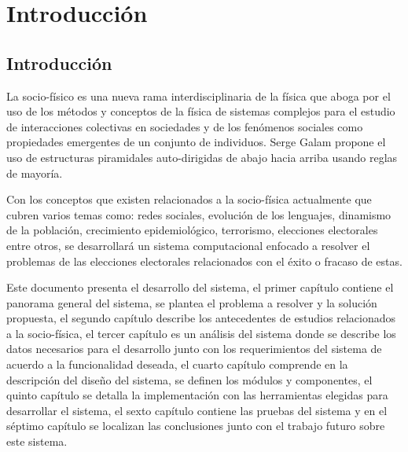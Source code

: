 \newpage 
\chapter*{Introducción}

\vspace*{2cm}

\section*{Introducción}
La socio-físico es una nueva rama interdisciplinaria de la física que aboga por el uso de los métodos y conceptos de la física de sistemas complejos para el estudio de interacciones colectivas en sociedades y de los fenómenos sociales como propiedades emergentes de un conjunto de individuos. Serge Galam propone el uso de estructuras piramidales auto-dirigidas de abajo hacia arriba usando reglas de mayoría. \cite{MarioH.RamirezDiaz2014, Galam.1986, Galam1990, Galam1991, Galam2000}

Con los conceptos que existen relacionados a la socio-física actualmente que cubren varios temas como: redes sociales, evolución de los lenguajes, dinamismo de la población, crecimiento epidemiológico, terrorismo, elecciones electorales entre otros, se desarrollará un sistema computacional enfocado a resolver el problemas de las elecciones electorales relacionados con el éxito o fracaso de estas.

Este documento presenta el desarrollo del sistema, el primer capítulo contiene el panorama general del sistema, se plantea el problema a resolver y la solución propuesta, el segundo capítulo describe los antecedentes de estudios relacionados a la socio-física, el tercer capítulo es un análisis del sistema donde se describe los datos necesarios para el desarrollo junto con los requerimientos del sistema de acuerdo a la funcionalidad deseada, el cuarto capítulo comprende en la descripción del diseño del sistema, se definen los módulos y componentes, el quinto capítulo se detalla la implementación con las herramientas elegidas para desarrollar el sistema, el sexto capítulo contiene las pruebas del sistema y en el séptimo capítulo se localizan las conclusiones junto con el trabajo futuro sobre este sistema. 

